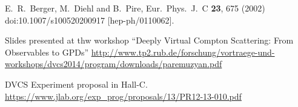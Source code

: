 \documentclass[letterpaper,12pt]{article}
\begin{document}
 
 \begin{thebibliography}{100}
  E.~R.~Berger, M.~Diehl and B.~Pire,
  Eur.\ Phys.\ J.\ C {\bf 23}, 675 (2002)
  doi:10.1007/s100520200917
  [hep-ph/0110062].
  
 Slides presented at thw workshop ``Deeply Virtual Compton Scattering: From Observables to GPDs'' 
 \href{http://www.tp2.rub.de/forschung/vortraege-und-workshops/dvcs2014/program/downloads/paremuzyan.pdf}{http://www.tp2.rub.de/forschung/vortraege-und-workshops/dvcs2014/program/downloads/paremuzyan.pdf}
 
 DVCS Experiment proposal in Hall-C.
 \href{https://www.jlab.org/exp\_prog/proposals/13/PR12-13-010.pdf}{https://www.jlab.org/exp\_prog/proposals/13/PR12-13-010.pdf}
 

 \end{thebibliography}
\end{document}
